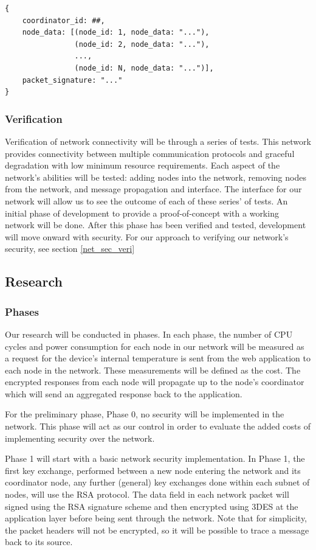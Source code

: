 \documentclass[tikz,a4paper,titlepage]{article}
\begin{document}
\begin{lstlisting}
{
    coordinator_id: ##,
    node_data: [(node_id: 1, node_data: "..."),
                (node_id: 2, node_data: "..."),
                ...,
                (node_id: N, node_data: "...")],
    packet_signature: "..."
}
\end{lstlisting}
\subsubsection{Verification}

Verification of network connectivity will be through a series of tests. This network provides connectivity between multiple communication protocols and graceful degradation with low minimum resource requirements. Each aspect of the network's abilities will be tested: adding nodes into the network, removing nodes from the network, and message propagation and interface. The interface for our network will allow us to see the outcome of each of these series' of tests. An initial phase of development to provide a proof-of-concept with a working network will be done. After this phase has been verified and tested, development will move onward with security. For our approach to verifying our network's security, see section \ref{net_sec_veri}


\subsection{Research}

\subsubsection{Phases}

Our research will be conducted in phases. In each phase, the number of CPU cycles and power consumption for each node in our network will be measured as a request for the device's internal temperature is sent from the web application to each node in the network. These measurements will be defined as the cost. The encrypted responses from each node will propagate up to the node's coordinator which will send an aggregated response back to the application. 

For the preliminary phase, Phase 0, no security will be implemented in the network. This phase will act as our control in order to evaluate the added costs of implementing security over the network.

Phase 1 will start with a basic network security implementation. In Phase 1, the first key exchange, performed between a new node entering the network and its coordinator node, any further (general) key exchanges done within each subnet of nodes, will use the RSA protocol. The data field in each network packet will signed using the RSA signature scheme and then encrypted using 3DES at the application layer before being sent through the network. Note that for simplicity, the packet headers will not be encrypted, so it will be possible to trace a message back to its source.
\end{document}
